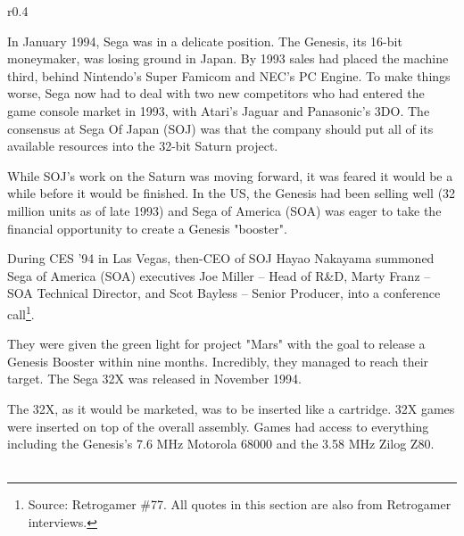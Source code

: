 \begin{wrapfigure}[4]{r}{0.4\textwidth}{
\centering {}}
\end{wrapfigure}
In January 1994, Sega was in a delicate position. The Genesis, its 16-bit moneymaker, was losing ground in Japan. By 1993 sales had placed the machine third, behind Nintendo's Super Famicom and NEC's PC Engine. To make things worse, Sega now had to deal with two new competitors who had entered the game console market in 1993, with Atari's Jaguar and Panasonic's 3DO. The consensus at Sega Of Japan (SOJ) was that the company should put all of its available resources into the 32-bit Saturn project.\\
\par
While SOJ's work on the Saturn was moving forward, it was feared it would be a while before it would be finished. In the US, the Genesis had been selling well (32 million units as of late 1993) and Sega of America (SOA) was eager to take the financial opportunity to create a Genesis "booster".\\
\par
During CES '94 in Las Vegas, then-CEO of SOJ Hayao Nakayama summoned Sega of America (SOA) executives Joe Miller -- Head of R\&D, Marty Franz -- SOA Technical Director, and Scot Bayless -- Senior Producer, into a conference call\footnote{Source: Retrogamer \#77. All quotes in this section are also from Retrogamer interviews.}.\\
\par 
They were given the green light for project "Mars" with the goal to release a Genesis Booster within nine months. Incredibly, they managed to reach their target. The Sega 32X was released in November 1994.\\
\par
{}%
\par
The 32X, as it would be marketed, was to be inserted like a cartridge. 32X games were inserted on top of the overall assembly. Games had access to everything including the Genesis's 7.6 MHz Motorola 68000 and the 3.58 MHz Zilog Z80.\\

\\
\par

